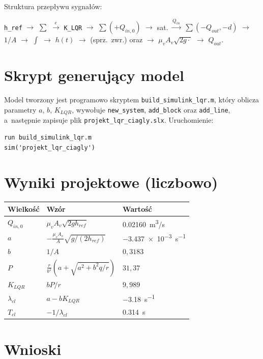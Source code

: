 \documentclass[11pt,a4paper]{article}
\begin{document}
\noindent Struktura przepływu sygnałów:
\begin{center}
\small
\texttt{h\_ref} $\to$ $\sum$ $\xrightarrow{e}$ \texttt{K\_LQR} $\to$
$\sum(+Q_{in,0})$ $\to$ sat. $\xrightarrow{Q_{in}}$
$\sum(-Q_{out},-d)$ $\to$ $1/A$ $\to$ $\int$ $\to$ $h(t)$
$\to$ (sprz.\ zwr.) oraz $\to$ $\mu_v A_v\sqrt{2g\cdot}$ $\to$ $Q_{out}$.
\end{center}

\section{Skrypt generujący model}

Model tworzony jest programowo skryptem \texttt{build\_simulink\_lqr.m},
który oblicza parametry $a$, $b$, $K_{LQR}$, wywołuje \texttt{new\_system},
\texttt{add\_block} oraz \texttt{add\_line}, a~następnie zapisuje plik
\texttt{projekt\_lqr\_ciagly.slx}. Uruchomienie:

\begin{lstlisting}[style=matlab]
run build_simulink_lqr.m
sim('projekt_lqr_ciagly')
\end{lstlisting}

\section{Wyniki projektowe (liczbowo)}

\begin{center}
\begin{tabular}{@{}lll@{}}
\toprule
Wielkość & Wzór & Wartość \\
\midrule
$Q_{in,0}$ & $\mu_v A_v\sqrt{2gh_{ref}}$        & \SI{0.02160}{m^3/s} \\
$a$        & $-\tfrac{\mu_v A_v}{A}\sqrt{g/(2h_{ref})}$ & \SI{-3.437e-3}{s^{-1}} \\
$b$        & $1/A$                              & $0{,}3183$ \\
$P$        & $\tfrac{r}{b^2}(a+\sqrt{a^2+b^2q/r})$ & $31{,}37$ \\
$K_{LQR}$  & $bP/r$                             & $9{,}989$ \\
$\lambda_{cl}$ & $a-bK_{LQR}$                   & \SI{-3.18}{s^{-1}} \\
$T_{cl}$   & $-1/\lambda_{cl}$                  & \SI{0.314}{s} \\
\bottomrule
\end{tabular}
\end{center}

\section{Wnioski}
\end{document}
